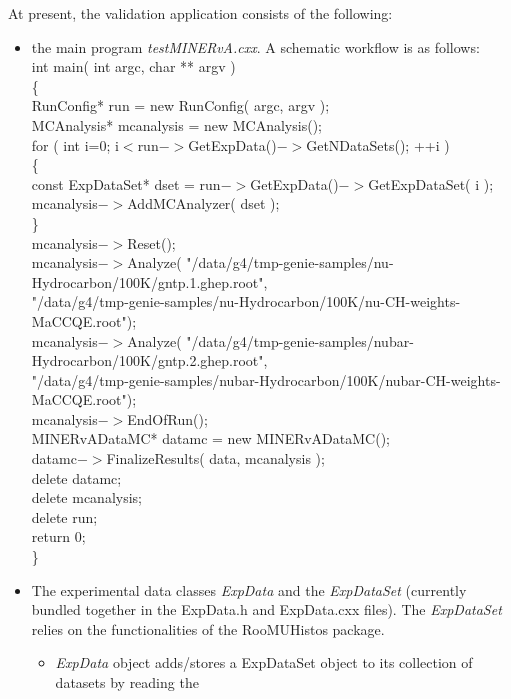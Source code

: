 At present, the validation application consists of the following:
\begin{itemize}
\item{the main program {\it testMINERvA.cxx}.
A schematic workflow is as follows: \\
{\small 
int main( int argc, char ** argv ) \\
\{   \\
RunConfig* run      = new RunConfig( argc, argv ); \\
MCAnalysis* mcanalysis = new MCAnalysis(); \\
   for ( int i=0; i$<$run$->$GetExpData()$->$GetNDataSets(); ++i ) \\
   \{ \\
      const ExpDataSet* dset   = run$->$GetExpData()$->$GetExpDataSet( i ); \\
      mcanalysis$->$AddMCAnalyzer( dset ); \\
   \} \\
   mcanalysis$->$Reset(); \\
   mcanalysis$->$Analyze( "/data/g4/tmp-genie-samples/nu-Hydrocarbon/100K/gntp.1.ghep.root", \\
                        "/data/g4/tmp-genie-samples/nu-Hydrocarbon/100K/nu-CH-weights-MaCCQE.root"); \\
   mcanalysis$->$Analyze( "/data/g4/tmp-genie-samples/nubar-Hydrocarbon/100K/gntp.2.ghep.root", \\
                        "/data/g4/tmp-genie-samples/nubar-Hydrocarbon/100K/nubar-CH-weights-MaCCQE.root"); \\
   mcanalysis$->$EndOfRun(); \\
   MINERvADataMC* datamc = new MINERvADataMC(); \\   
   datamc$->$FinalizeResults( data, mcanalysis ); \\
   delete datamc; \\
   delete mcanalysis; \\
   delete run; \\
   return 0; \\
\} \\
}
}
\item{The experimental data classes {\it ExpData} and the {\it ExpDataSet} (currently bundled together 
in the ExpData.h and ExpData.cxx files). The {\it ExpDataSet} relies on the functionalities of the RooMUHistos 
package\cite{roomuhistos}.
\begin{itemize}
\item{ {\it ExpData} object adds/stores a ExpDataSet object to its collection of datasets by reading the 
}
\end{itemize}}
\end{itemize}
